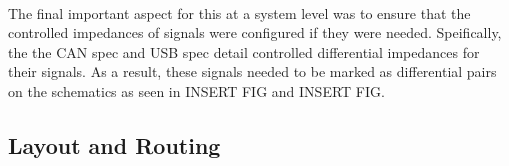 \paragraph{}
The final important aspect for this at a system level was to ensure that the controlled impedances of signals were configured if they were needed.
Speifically, the the CAN spec and USB spec detail controlled differential impedances for their signals.
As a result, these signals needed to be marked as differential pairs on the schematics as seen in INSERT FIG and INSERT FIG.

\subsection{Layout and Routing}
